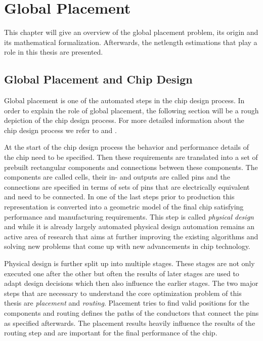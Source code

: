 \chapter{Global Placement} \label{chap:global_placement}

This chapter will give an overview of the global placement problem, its origin and its mathematical formalization.
Afterwards, the netlength estimations that play a role in this thesis are presented.

\section{Global Placement and Chip Design} \label{sec:global_placement_and_chip_design}

Global placement is one of the automated steps in the chip design process.
In order to explain the role of global placement, the following section will be a rough depiction of the chip design process.
For more detailed information about the chip design process we refer to
\cite{AlpertMehtaSapatnekar-HandbookOfAlgorithmsForPhysicalDesignAutomation} and \cite{LavagnoMarkovMartinScheffer-EDAImplementationCircuitDesignProcessTechnology}.

At the start of the chip design process the behavior and performance details of the chip need to be specified.
Then these requirements are translated into a set of prebuilt rectangular components and connections between these components.
The components are called cells, their in- and outputs are called pins 
and the connections are specified in terms of sets of pins that are electrically equivalent and need to be connected.
In one of the last steps prior to production this representation is converted into a geometric model of the final chip
satisfying performance and manufacturing requirements.
This step is called \emph{physical design} and while it is already largely automated
physical design automation remains an active area of research
that aims at further improving the existing algorithms and solving new problems that come up with new advancements in chip technology.

Physical design is further split up into multiple stages.
These stages are not only executed one after the other
but often the results of later stages are used to adapt design decisions which then also influence the earlier stages.
The two major steps that are necessary to understand the core optimization problem of this thesis are \emph{placement} and \emph{routing}.
Placement tries to find valid positions for the components and routing defines the paths of the conductors that connect the pins as specified afterwards.
The placement results heavily influence the results of the routing step and are important for the final performance of the chip.

